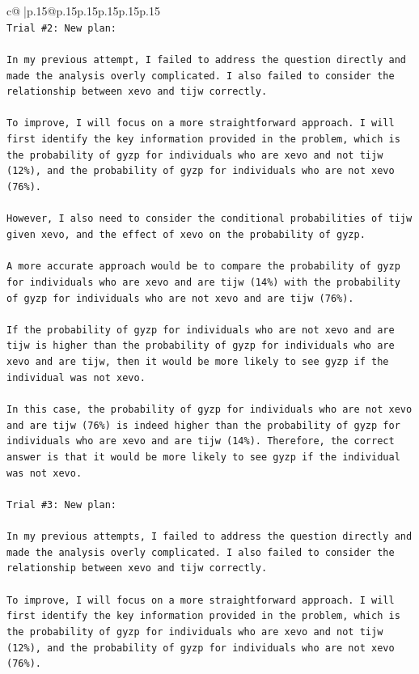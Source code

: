 \documentclass{article}
\begin{document}
{\begin{supertabular}{c@{$\;$}|p{.15\linewidth}@{}p{.15\linewidth}p{.15\linewidth}p{.15\linewidth}p{.15\linewidth}p{.15\linewidth}}
{{{\\ 
\texttt{Trial \#2: New plan: } \\
\\ 
\texttt{In my previous attempt, I failed to address the question directly and made the analysis overly complicated. I also failed to consider the relationship between xevo and tijw correctly. } \\
\\ 
\texttt{To improve, I will focus on a more straightforward approach. I will first identify the key information provided in the problem, which is the probability of gyzp for individuals who are xevo and not tijw (12\%), and the probability of gyzp for individuals who are not xevo (76\%). } \\
\\ 
\texttt{However, I also need to consider the conditional probabilities of tijw given xevo, and the effect of xevo on the probability of gyzp. } \\
\\ 
\texttt{A more accurate approach would be to compare the probability of gyzp for individuals who are xevo and are tijw (14\%) with the probability of gyzp for individuals who are not xevo and are tijw (76\%). } \\
\\ 
\texttt{If the probability of gyzp for individuals who are not xevo and are tijw is higher than the probability of gyzp for individuals who are xevo and are tijw, then it would be more likely to see gyzp if the individual was not xevo. } \\
\\ 
\texttt{In this case, the probability of gyzp for individuals who are not xevo and are tijw (76\%) is indeed higher than the probability of gyzp for individuals who are xevo and are tijw (14\%). Therefore, the correct answer is that it would be more likely to see gyzp if the individual was not xevo.} \\
\\ 
\texttt{Trial \#3: New plan: } \\
\\ 
\texttt{In my previous attempts, I failed to address the question directly and made the analysis overly complicated. I also failed to consider the relationship between xevo and tijw correctly. } \\
\\ 
\texttt{To improve, I will focus on a more straightforward approach. I will first identify the key information provided in the problem, which is the probability of gyzp for individuals who are xevo and not tijw (12\%), and the probability of gyzp for individuals who are not xevo (76\%). } \\
}}}
\end{supertabular}}
\end{document}
